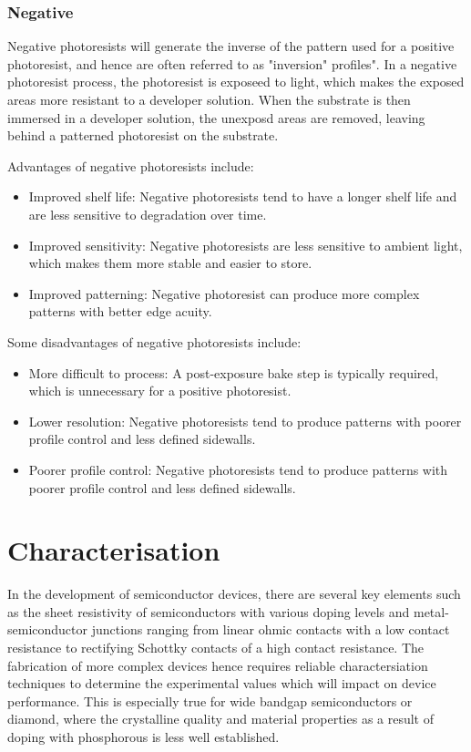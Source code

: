 \subsubsection{Negative}
Negative photoresists will generate the inverse of the pattern used for a positive photoresist, and hence are often referred to as "inversion" profiles". In a negative photoresist process, the photoresist is exposeed to light, which makes the exposed areas more resistant to a developer solution. When the substrate is then immersed in a developer solution, the unexposd areas are removed, leaving behind a patterned photoresist on the substrate.

Advantages of negative photoresists include:
\begin{itemize}
    \item Improved shelf life: Negative photoresists tend to have a longer shelf life and are less sensitive to degradation over time.
    \item Improved sensitivity: Negative photoresists are less sensitive to ambient light, which makes them more stable and easier to store.
    \item Improved patterning: Negative photoresist can produce more complex patterns with better edge acuity.
\end{itemize}
Some disadvantages of negative photoresists include:
\begin{itemize}
    \item More difficult to process: A post-exposure bake step is typically required, which is unnecessary for a positive photoresist.
    \item Lower resolution: Negative photoresists tend to produce patterns with poorer profile control and less defined sidewalls.
    \item Poorer profile control: Negative photoresists tend to produce patterns with poorer profile control and less defined sidewalls.
\end{itemize}

\section{Characterisation}
In the development of semiconductor devices, there are several key elements such as the sheet resistivity of semiconductors with various doping levels and metal-semiconductor junctions ranging from linear ohmic contacts with a low contact resistance to rectifying Schottky contacts of a high contact resistance. The fabrication of more complex devices hence requires reliable charactersiation techniques to determine the experimental values which will impact on device performance. This is especially true for wide bandgap semiconductors or diamond, where the crystalline quality and material properties as a result of doping with phosphorous is less well established.

